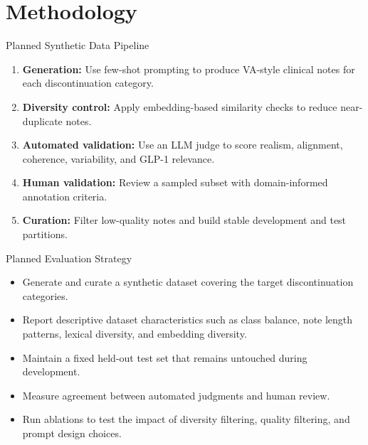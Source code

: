 \documentclass[aspectratio=169]{beamer}
\begin{document}
\section{Methodology}

\begin{frame}{Planned Synthetic Data Pipeline}
    \begin{enumerate}
        \item \textbf{Generation:} Use few-shot prompting to produce VA-style clinical notes for each discontinuation category.
        \item \textbf{Diversity control:} Apply embedding-based similarity checks to reduce near-duplicate notes.
        \item \textbf{Automated validation:} Use an LLM judge to score realism, alignment, coherence, variability, and GLP-1 relevance.
        \item \textbf{Human validation:} Review a sampled subset with domain-informed annotation criteria.
        \item \textbf{Curation:} Filter low-quality notes and build stable development and test partitions.
    \end{enumerate}
\end{frame}

\begin{frame}{Planned Evaluation Strategy}
    \begin{itemize}
        \item Generate and curate a synthetic dataset covering the target discontinuation categories.
        \item Report descriptive dataset characteristics such as class balance, note length patterns, lexical diversity, and embedding diversity.
        \item Maintain a fixed held-out test set that remains untouched during development.
        \item Measure agreement between automated judgments and human review.
        \item Run ablations to test the impact of diversity filtering, quality filtering, and prompt design choices.
    \end{itemize}
\end{frame}
\end{document}
